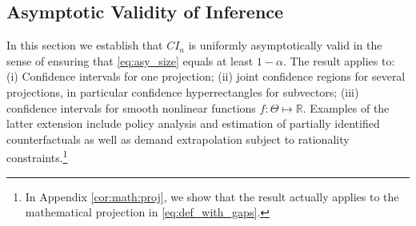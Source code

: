 \documentclass[letterpaper,11pt]{article}
\theoremstyle{myplain}
\theoremstyle{mydefinition}
\theoremstyle{myremark}
\newcommand{\R}{\mathbb{R}}
\numberwithin{equation}{section}
\numberwithin{figure}{section}
\begin{document}
\subsection{Asymptotic Validity of Inference}
\label{sec:main:res}
In this section we establish that $CI_n$ is uniformly asymptotically valid in the sense of ensuring that \eqref{eq:asy_size} equals at least $1-\alpha$. The result applies to: (i) Confidence intervals for one projection; (ii) joint confidence regions for several projections, in particular confidence hyperrectangles for subvectors; (iii) confidence intervals for smooth nonlinear functions $f:\Theta \mapsto \R$. Examples of the latter extension include policy analysis and estimation of partially identified counterfactuals as well as demand extrapolation subject to rationality constraints.\footnote{In Appendix \ref{cor:math:proj}, we show that the result actually applies to the mathematical projection in \eqref{eq:def_with_gaps}.}
\end{document}

